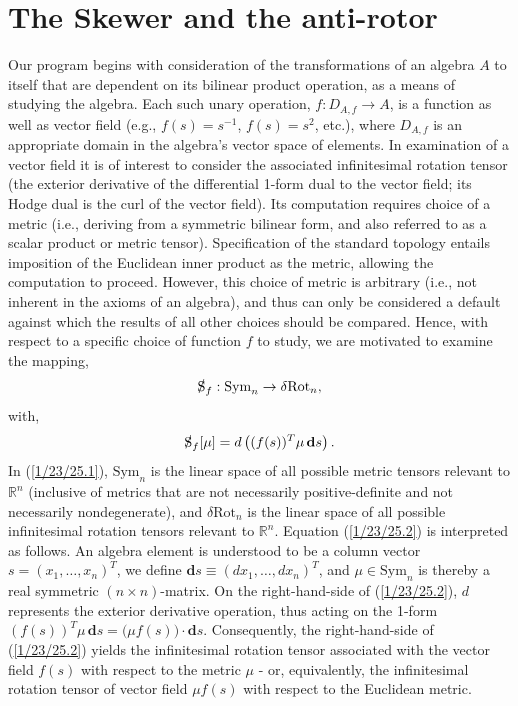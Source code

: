 \documentclass{amsart}
\theoremstyle{definition}
\numberwithin{theorem}{section}
\numberwithin{equation}{section}
\begin{document}
\section{The Skewer and the anti-rotor} Our program begins with consideration of the transformations of an algebra $A$ to itself that are dependent on its bilinear product operation, as a means of studying the algebra.   Each such unary operation, $f:D_{A,f}\rightarrow A$, is a function as well as vector field (e.g., $f(s)=s^{-1}$, $f(s)=s^2$, etc.), where $D_{A,f}$ is an appropriate domain in the algebra's vector space of elements.  In examination of a vector field it is of interest to consider the associated infinitesimal rotation tensor (the exterior derivative of the differential 1-form dual to the vector field; its Hodge dual is the curl of the vector field).  Its computation requires choice of a metric (i.e., deriving from a symmetric bilinear form, and also referred to as a scalar product or metric tensor).  Specification of the standard topology entails imposition of the Euclidean inner product as the metric, allowing the computation to proceed.  However, this choice of metric is arbitrary (i.e., not inherent in the axioms of an algebra), and thus can only be considered a default against which the results of all other choices should be compared.  Hence, with respect to a specific choice of function $f$ to study, we are motivated to examine the mapping, \enlargethispage{1cm}  \begin{equation}\label{1/23/25.1} \slashed{\text{S}}_f: \text{Sym}_n \rightarrow \delta\text{Rot}_n,\end{equation}  
with, \begin{equation}\label{1/23/25.2} \slashed{\text{S}}_f[\mu] = d\left((f(s))^T \mu \,\mathbf{d}s\right).  \end{equation}
In (\ref{1/23/25.1}), $\text{Sym}_n$ is the linear space of all possible metric tensors relevant to $\mathbb{R}^n$ (inclusive of metrics that are not necessarily positive-definite and not necessarily nondegenerate), and $\delta\text{Rot}_n$ is the linear space of all possible infinitesimal rotation tensors relevant to $\mathbb{R}^n$.  Equation (\ref{1/23/25.2}) is interpreted as follows.  An algebra element is understood to be a column vector $s=(x_1,\dots,x_n)^T$, we define $\mathbf{d}s \equiv (dx_1,\dots,dx_n)^T$, and $\mu\in \text{Sym}_n$ is thereby a real symmetric $(n\times n)$-matrix.  On the right-hand-side of (\ref{1/23/25.2}), $d$ represents the exterior derivative operation, thus acting on the 1-form $(f(s))^T \mu \,\mathbf{d}s = \big(\mu f(s)\big)\cdot\mathbf{d}s$.   Consequently, the right-hand-side of (\ref{1/23/25.2}) yields the infinitesimal rotation tensor associated with the vector field $f(s)$ with respect to the metric $\mu$ - or, equivalently, the infinitesimal rotation tensor of vector field $\mu f(s)$ with respect to the Euclidean metric.
\end{document}
